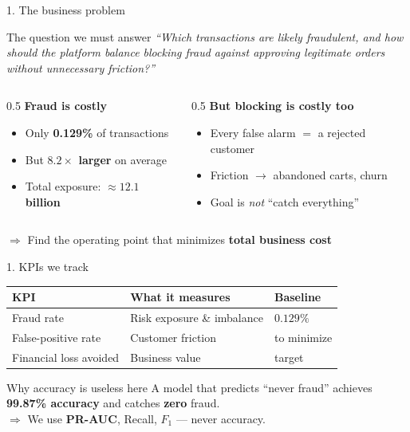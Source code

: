 \documentclass[aspectratio=169]{beamer}
\newcommand{\good}[1]{\textcolor{good}{\textbf{#1}}}
\begin{document}
\begin{frame}{1. The business problem}
\begin{block}{The question we must answer}
\emph{``Which transactions are likely fraudulent, and how should the platform
balance blocking fraud against approving legitimate orders without
unnecessary friction?''}
\end{block}

\vspace{0.5em}
\begin{columns}[T]
\begin{column}{0.5\textwidth}
\textbf{Fraud is costly}
\begin{itemize}
    \item Only \good{0.129\%} of transactions
    \item But \good{$8.2\times$ larger} on average
    \item Total exposure: \good{$\approx 12.1$ billion}
\end{itemize}
\end{column}
\begin{column}{0.5\textwidth}
\textbf{But blocking is costly too}
\begin{itemize}
    \item Every false alarm $=$ a rejected customer
    \item Friction $\to$ abandoned carts, churn
    \item Goal is \emph{not} ``catch everything''
\end{itemize}
\end{column}
\end{columns}

\vspace{0.8em}
\centering
\alert{$\Rightarrow$ Find the operating point that minimizes \textbf{total business cost}}
\end{frame}

\begin{frame}{1. KPIs we track}
\begin{table}
\centering
\begin{tabular}{lll}
\toprule
KPI & What it measures & Baseline \\
\midrule
Fraud rate & Risk exposure \& imbalance & $0.129\%$ \\
False-positive rate & Customer friction & to minimize \\
Financial loss avoided & Business value & target \\
\bottomrule
\end{tabular}
\end{table}

\vspace{1em}
\begin{alertblock}{Why accuracy is useless here}
A model that predicts ``never fraud'' achieves \textbf{99.87\% accuracy}
and catches \textbf{zero} fraud.\\
$\Rightarrow$ We use \good{PR-AUC}, Recall, $F_1$ --- never accuracy.
\end{alertblock}
\end{frame}
\end{document}

